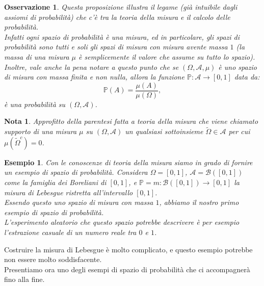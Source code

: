 \documentclass[11pt]{book}
\theoremstyle{Definizione}
\theoremstyle{TeoremaProposizioneLemmaCorollario}
\theoremstyle{OsservazioneNota}
\newtheorem{myobs}{Osservazione}[section]
\newtheorem*{mynota}{Nota}
\newtheorem{myes}{Esempio}[section]
\renewcommand{\P}{\mathbb{P}}
\newcommand{\Borel}{\mathcal{B}}
\begin{document}
\begin{myobs}
Questa proposizione illustra il legame (già intuibile dagli assiomi di probabilità) che c'è tra la teoria della misura e il calcolo delle probabilità.\\
Infatti ogni spazio di probabilità è una misura, ed in particolare, gli spazi di probabilità sono tutti e soli gli spazi di misura con misura avente massa $1$ (la massa di una misura $\mu$ è semplicemente il valore che assume su tutto lo spazio).\\
Inoltre, vale anche la pena notare a questo punto che se $(\Omega,\mathcal{A},\mu)$ è uno spazio di misura con massa finita e non nulla, allora la funzione $\P:\mathcal{A}\longrightarrow [0,1]$ data da:
$$
\P(A) = \frac{\mu(A)}{\mu(\Omega)},
$$
è una probabilità su $(\Omega,\mathcal{A})$.
\end{myobs}
\begin{mynota}
Approfitto della parentesi fatta a teoria della misura che viene chiamato supporto di una misura $\mu$ su $(\Omega,\mathcal{A})$ un qualsiasi sottoinsieme $\widetilde{\Omega}\in \mathcal{A}$ per cui $\mu(\widetilde{\Omega}^c) = 0$.
\end{mynota}
\begin{myes}
Con le conoscenze di teoria della misura siamo in grado di fornire un esempio di spazio di probabilità. Considera $\Omega = [0,1]$, $\mathcal{A} = \Borel([0,1])$ come la famiglia dei Boreliani di $[0,1]$, e $\P = m:\Borel([0,1])\longrightarrow [0,1]$ la misura di Lebesgue ristretta all'intervallo $[0,1]$.\\
Essendo questo uno spazio di misura con massa $1$, abbiamo il nostro primo esempio di spazio di probabilità.\\
L'esperimento aleatorio che questo spazio potrebbe descrivere è per esempio l'estrazione casuale di un numero reale tra $0$ e $1$.
\end{myes}
Costruire la misura di Lebesgue è molto complicato, e questo esempio potrebbe non essere molto soddisfacente.\\
Presentiamo ora uno degli esempi di spazio di probabilità che ci accompagnerà fino alla fine.
\end{document}
